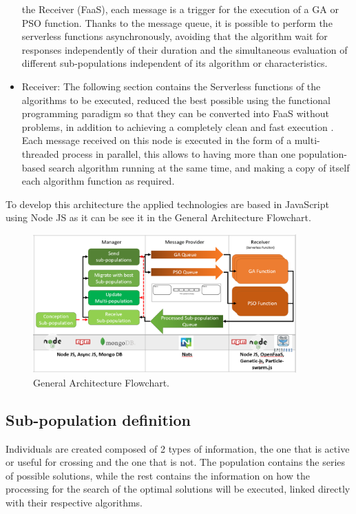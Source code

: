 \documentclass[runningheads]{llncs}
\begin{document}
\begin{itemize}
the Receiver (FaaS), each message is a trigger for the execution of a GA or PSO
function. Thanks to the message queue, it is possible to perform the serverless
functions asynchronously, avoiding that the algorithm wait for responses
independently of their duration and the simultaneous evaluation of different
sub-populations independent of its algorithm or characteristics.
\item Receiver: The following section contains the Serverless functions of the
algorithms to be executed, reduced the best possible using the functional
programming paradigm so that they can be converted into FaaS without problems,
in addition to achieving a completely clean and fast execution
\cite{Roberts2016} . Each message received on this node is executed in the form
of a multi-threaded process in parallel, this allows to having more than one
population-based search algorithm running at the same time, and making a copy of
itself each algorithm function as required.
\end{itemize}

To develop this architecture the applied technologies are based in JavaScript
using Node JS as it can be see it in the General Architecture Flowchart.

\begin{figure}[htp]
  \centering
  \includegraphics[width=0.9\textwidth]{img/general diagram architecture 2.png}
  \caption{General Architecture Flowchart.} \label{fig1}
  \end{figure}

\subsection{Sub-population definition}

Individuals are created composed of 2 types of information, the one that is
active or useful for crossing and the one that is not. The population contains
the series of possible solutions, while the rest contains the information on how
the processing for the search of the optimal solutions will be executed, linked
directly with their respective algorithms.
\end{document}
